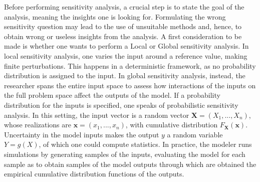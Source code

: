 Before performing sensitivity analysis, a crucial step is to state the goal of the analysis, meaning the insights one is looking for. Formulating the wrong sensitivity question may lead to the use of unsuitable methods and, hence, to obtain wrong or useless insights from the analysis. A first consideration to be made is whether one wants to perform a Local or Global sensitivity analysis. In local sensitivity analysis, one varies the input around a reference value, making finite perturbations. This happens in a deterministic framework, as no probability distribution is assigned to the input. In global sensitivity analysis, instead, the researcher spans the entire input space to assess how interactions of the inputs on the full problem space affect the outputs of the model. If a probability distribution for the inputs is specified, one speaks of probabilistic sensitivity analysis. In this setting, the input vector is a random vector $\textbf{X} = (X_1, ..., X_n)$, whose realizations are $\textbf{x} = (x_1, ..., x_n)$, with cumulative distribution $F_{\textbf{X}}(\textbf{x})$. Uncertainty in the model inputs makes the output $y$ a random variable $Y = g(X)$, of which one could compute statistics. In practice, the modeler runs simulations by generating samples of the inputs, evaluating the model for each sample as to obtain samples of the model outputs through which are obtained the empirical cumulative distribution functions of the outputs.

